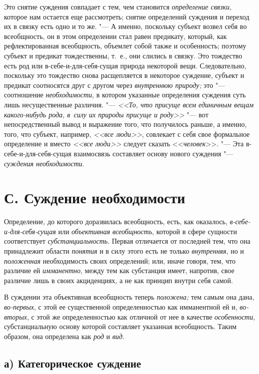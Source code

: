 Это снятие суждения совпадает с тем, чем становится {\em определение связки},
которое нам остается еще рассмотреть; снятие определений суждения и переход их
в связку есть одно и то же. "--- А именно, поскольку субъект возвел себя во
всеобщность, он в этом определении стал равен предикату, который, как
рефлектированная всеобщность, объемлет собой также и особенность; поэтому
субъект и предикат тождественны, т.~е., они слились в связку. Это тождество
есть род или в-себе-и-для-себя-сущая природа некоторой вещи. Следовательно,
поскольку это тождество снова расщепляется в некоторое суждение, субъект и
предикат соотносятся друг с другом через {\em внутреннюю природу;} это "---
соотношение {\em необходимости}, в котором указанные определения суждения суть
лишь несущественные различия. "--- {\em <<То, что присуще всем единичным вещам
какого-нибудь рода, в~силу их природы присуще и роду>>} "--- вот
непосредственный вывод и выражение того, что получилось раньше, а именно, того,
что субъект, например, {\em <<все люди>>}, совлекает с себя свое формальное
определение и вместо {\em <<все люди>>} следует сказать <<{\em человек}>>. "---
Эта в-себе-и-для-себя-сущая взаимосвязь составляет основу нового суждения "---
{\em суждения необходимости}.

\section[С. Суждение необходимости]{С. Суждение необходимости}

Определение, до которого доразвилась всеобщность, есть, как
оказалось, {\em в-себе-и-для-себя-сущая} или {\em объективная
всеобщность}, которой в сфере сущности соответствует {\em субстанциальность}.
Первая отличается от последней тем, что она принадлежит
области {\em понятия} и в силу этого есть не только {\em внутренняя}, но и
{\em положенная} необходимость своих определений; или, иначе говоря, тем, что
различие ей {\em имманентно},
между тем как субстанция имеет, напротив, свое различие лишь
в своих акциденциях, а не как принцип внутри себя самой.

В суждении эта объективная всеобщность теперь {\em положена;} тем самым
она дана, {\em во-первых}, с этой ее существенной определенностью как
имманентной ей и, {\em во-вторых}, с этой
же определенностью как отличной от нее в качестве {\em особенности},
субстанциальную основу которой составляет указанная
всеобщность. Таким образом, она определена как {\em род} и {\em вид}.

\subsection[а) Категорическое суждение]{а) Категорическое суждение}

